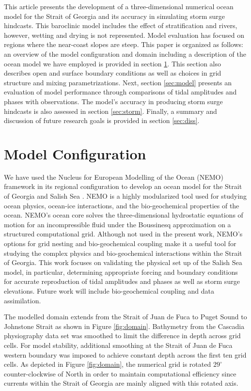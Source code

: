 \documentclass[pdftex,10pt]{article}
\begin{document}
This article presents the development of a three-dimensional numerical ocean model for the Strait of Georgia and its accuracy in simulating storm surge hindcasts. This baroclinic model includes the effect of stratification and rivers, however, wetting and drying is not represented. Model evaluation has focused on regions where the near-coast slopes are steep.  This paper is organized as follows: an overview of the model configuration and domain including a description of the ocean model we have employed is provided in section \ref{sec:config}. This section also describes open and surface boundary conditions as well as choices in grid structure and mixing parametrizations. Next, section \ref{sec:model} presents an evaluation of model performance through comparisons of tidal amplitudes and phases with observations. The model's accuracy in producing storm surge hindcasts is also assessed in section \ref{sec:storm}. Finally, a summary and discussion of future research goals is provided in section \ref{sec:diss}.  

\section{Model Configuration}\label{sec:config}

We have used the Nucleus for European Modelling of the Ocean (NEMO) framework in its regional configuration to develop an ocean model for the Strait of Georgia and Salish Sea \citep{madec2012nemo}. NEMO is a highly modularized tool used for studying ocean physics, ocean-ice interactions, and the bio-geochemical properties of the ocean. NEMO's ocean core solves the three-dimensional hydrostatic equations of motion for an incompressible fluid under the Boussinesq approximation on a structured computational grid. Although not used in the present work, NEMO's options for grid nesting and bio-geochemical coupling make it a useful tool for studying the complex physics and bio-geochemical interactions within the Strait of Georgia. This work focuses on validating the physical set up of the Salish Sea model, in particular, determining appropriate forcing and boundary conditions for accurate reproduction of tidal amplitudes and phases as well as storm surge elevations. Future work will include bio-geochemical coupling and data assimilation. 

The modelled domain extends from the Strait of Juan de Fuca to Puget Sound to Johnstone Strait as shown in Figure \ref{fig:domain}. Bathymetry from the Cascadia physiography data set \citep{haugerud1999digital} was smoothed to limit the difference in depth across grid cells. For model stability, additional smoothing at the Strait of Juan de Fuca western boundary was imposed to achieve constant depth across the first ten grid cells. As depicted in Figure \ref{fig:domain}, the numerical grid is rotated $29^{\circ}$ counter-clockwise of North in order to maintain computational efficiency since currents within the Strait of Georgia are mainly aligned with this rotated axis. 
\end{document}
